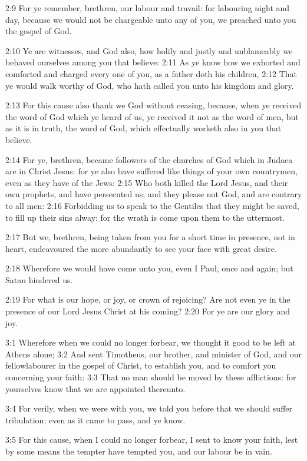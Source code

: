 2:9 For ye remember, brethren, our labour and travail: for labouring
night and day, because we would not be chargeable unto any of you, we
preached unto you the gospel of God.

2:10 Ye are witnesses, and God also, how holily and justly and
unblameably we behaved ourselves among you that believe: 2:11 As ye
know how we exhorted and comforted and charged every one of you, as a
father doth his children, 2:12 That ye would walk worthy of God, who
hath called you unto his kingdom and glory.

2:13 For this cause also thank we God without ceasing, because, when
ye received the word of God which ye heard of us, ye received it not
as the word of men, but as it is in truth, the word of God, which
effectually worketh also in you that believe.

2:14 For ye, brethren, became followers of the churches of God which
in Judaea are in Christ Jesus: for ye also have suffered like things
of your own countrymen, even as they have of the Jews: 2:15 Who both
killed the Lord Jesus, and their own prophets, and have persecuted us;
and they please not God, and are contrary to all men: 2:16 Forbidding
us to speak to the Gentiles that they might be saved, to fill up their
sins alway: for the wrath is come upon them to the uttermost.

2:17 But we, brethren, being taken from you for a short time in
presence, not in heart, endeavoured the more abundantly to see your
face with great desire.

2:18 Wherefore we would have come unto you, even I Paul, once and
again; but Satan hindered us.

2:19 For what is our hope, or joy, or crown of rejoicing? Are not even
ye in the presence of our Lord Jesus Christ at his coming?  2:20 For
ye are our glory and joy.

3:1 Wherefore when we could no longer forbear, we thought it good to
be left at Athens alone; 3:2 And sent Timotheus, our brother, and
minister of God, and our fellowlabourer in the gospel of Christ, to
establish you, and to comfort you concerning your faith: 3:3 That no
man should be moved by these afflictions: for yourselves know that we
are appointed thereunto.

3:4 For verily, when we were with you, we told you before that we
should suffer tribulation; even as it came to pass, and ye know.

3:5 For this cause, when I could no longer forbear, I sent to know
your faith, lest by some means the tempter have tempted you, and our
labour be in vain.

